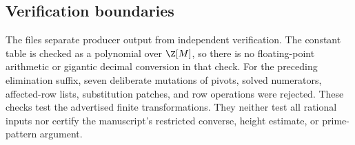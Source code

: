 \subsection{Verification boundaries}

The files separate producer output from independent verification. The
constant table is checked as a polynomial over $\Z[M]$, so there is no
floating-point arithmetic or gigantic decimal conversion in that check.
For the preceding elimination suffix, seven deliberate mutations of
pivots, solved numerators, affected-row lists, substitution patches,
and row operations were rejected. These checks test the advertised
finite transformations.
They neither test all rational inputs nor certify the manuscript's
restricted converse, height estimate, or prime-pattern argument.
